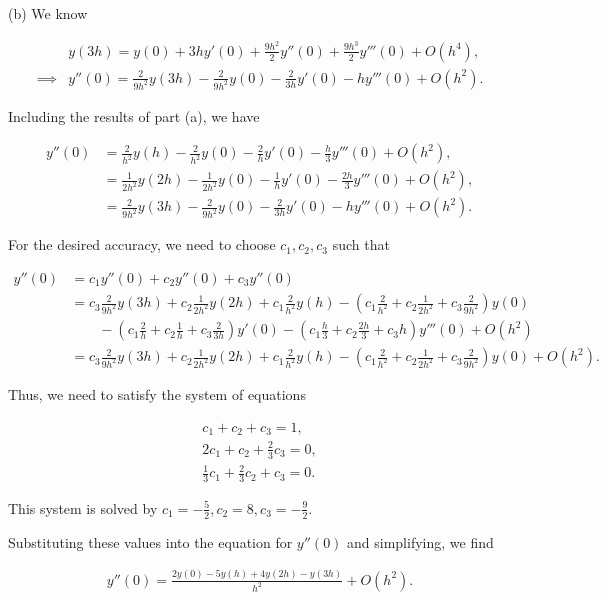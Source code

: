 \documentclass[12pt]{article}
\begin{document}
(b) We know

\begin{align*}
&y(3h) = y(0) + 3hy'(0) + \frac{9h^2}{2}y''(0) + \frac{9h^3}{2}y'''(0) + O(h^4), \\
\implies& y''(0) = \frac{2}{9h^2} y(3h) - \frac{2}{9h^2}y(0) - \frac{2}{3h}y'(0) - hy'''(0) + O(h^2).
\end{align*}

Including the results of part (a), we have

\begin{align*}
y''(0) &= \frac{2}{h^2} y(h) - \frac{2}{h^2}y(0) - \frac{2}{h}y'(0) - \frac{h}{3}y'''(0) + O(h^2), \\
&= \frac{1}{2h^2}y(2h) - \frac{1}{2h^2}y(0) - \frac{1}{h}y'(0) - \frac{2h}{3}y'''(0) + O(h^2), \\
&= \frac{2}{9h^2} y(3h) - \frac{2}{9h^2}y(0) - \frac{2}{3h}y'(0) - hy'''(0) + O(h^2).
\end{align*}

For the desired accuracy, we need to choose $c_1,c_2,c_3$ such that

\begin{align*}
y''(0) &= c_1y''(0) + c_2y''(0) + c_3y''(0) \\
&= c_3\frac{2}{9h^2} y(3h) + c_2\frac{1}{2h^2}y(2h) + c_1 \frac{2}{h^2} y(h) - (c_1\frac{2}{h^2} + c_2\frac{1}{2h^2} + c_3\frac{2}{9h^2})y(0) \\
&\quad\quad - (c_1\frac{2}{h} + c_2\frac{1}{h} + c_3\frac{2}{3h})y'(0) - (c_1\frac{h}{3} + c_2\frac{2h}{3} + c_3h)y'''(0) + O(h^2) \\
&= c_3\frac{2}{9h^2} y(3h) + c_2\frac{1}{2h^2}y(2h) + c_1 \frac{2}{h^2} y(h) - (c_1\frac{2}{h^2} + c_2\frac{1}{2h^2} + c_3\frac{2}{9h^2})y(0) + O(h^2).
\end{align*}

Thus, we need to satisfy the system of equations

\begin{align*}
c_1 + c_2 + c_3 = 1, \\
2c_1 + c_2 + \frac{2}{3}c_3 = 0, \\
\frac{1}{3}c_1 + \frac{2}{3}c_2 + c_3 = 0.
\end{align*}

This system is solved by $c_1 = -\frac{5}{2}, c_2 = 8, c_3 = -\frac{9}{2}$.

Substituting these values into the equation for $y''(0)$ and simplifying, we find

\begin{align*}
y''(0) = \frac{2y(0) - 5y(h) + 4y(2h) - y(3h)}{h^2} + O(h^2).
\end{align*}
\end{document}
